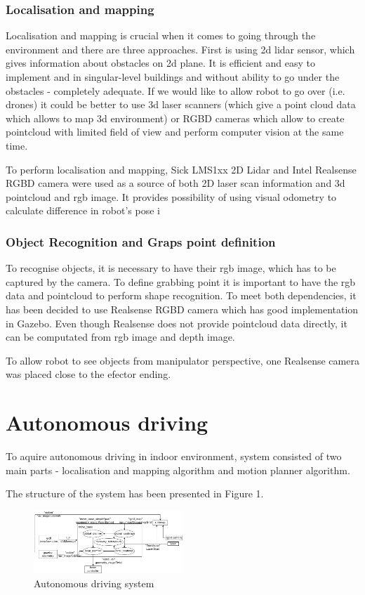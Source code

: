 \documentclass[conference,a4paper]{IEEEtran}
\begin{document}
\subsubsection{Localisation and mapping}
Localisation and mapping is crucial when it comes to going through the environment and there are three approaches. First is using 2d lidar sensor, which gives information about obstacles on 2d plane. It is efficient and easy to implement and in  singular-level buildings and without 
ability to go under the obstacles - completely adequate. If we would like to allow robot to go over (i.e. drones) it could be better to use 3d laser scanners (which give a point cloud data which allows to map 3d environment) or RGBD cameras which allow to create 
pointcloud with limited field of view and perform computer vision at the same time.

To perform localisation and mapping, Sick LMS1xx 2D Lidar and Intel Realsense RGBD camera were used as a source of both 2D laser scan information and 3d pointcloud and rgb image. It provides possibility of using visual odometry to calculate difference in robot's pose i


\subsubsection{Object Recognition and Graps point definition}
To recognise objects, it is necessary to have their rgb image, which has to be captured by the camera. 
To define grabbing point it is important to have the rgb data and pointcloud to perform shape recognition. To meet both dependencies, it has been decided to use Realsense RGBD camera which has good implementation in Gazebo. Even though Realsense does not provide pointcloud data directly, it can be 
computated from rgb image and depth image.

To allow robot to see objects from manipulator perspective, one Realsense camera was placed close to the efector ending.

\section{Autonomous driving}
To aquire autonomous driving in indoor environment, system consisted of two main parts - localisation and mapping algorithm and motion planner algorithm.

The structure of the system has been presented in Figure 1.

\begin{figure}[ht]
  \includegraphics[width=0.5\textwidth]{img/navigation_scheme.png}
  \caption[navigation structure]{Autonomous driving system}
\end{figure}
\end{document}
